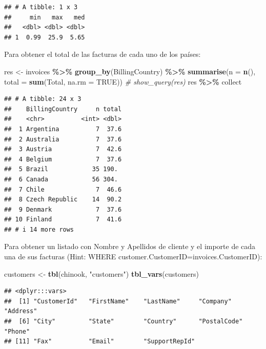 \documentclass[
]{book}
\newenvironment{Shaded}{\begin{snugshade}}{\end{snugshade}}
\newcommand{\AttributeTok}[1]{\textcolor[rgb]{0.13,0.29,0.53}{#1}}
\newcommand{\CommentTok}[1]{\textcolor[rgb]{0.56,0.35,0.01}{\textit{#1}}}
\newcommand{\ConstantTok}[1]{\textcolor[rgb]{0.56,0.35,0.01}{#1}}
\newcommand{\FunctionTok}[1]{\textcolor[rgb]{0.13,0.29,0.53}{\textbf{#1}}}
\newcommand{\NormalTok}[1]{#1}
\newcommand{\OtherTok}[1]{\textcolor[rgb]{0.56,0.35,0.01}{#1}}
\newcommand{\SpecialCharTok}[1]{\textcolor[rgb]{0.81,0.36,0.00}{\textbf{#1}}}
\newcommand{\StringTok}[1]{\textcolor[rgb]{0.31,0.60,0.02}{#1}}
\begin{document}
\begin{verbatim}
## # A tibble: 1 x 3
##     min   max   med
##   <dbl> <dbl> <dbl>
## 1  0.99  25.9  5.65
\end{verbatim}

Para obtener el total de las facturas de cada uno de los países:

\begin{Shaded}
\begin{Highlighting}[]
\NormalTok{res }\OtherTok{\textless{}{-}}\NormalTok{ invoices }\SpecialCharTok{\%\textgreater{}\%} \FunctionTok{group\_by}\NormalTok{(BillingCountry) }\SpecialCharTok{\%\textgreater{}\%} 
          \FunctionTok{summarise}\NormalTok{(}\AttributeTok{n =} \FunctionTok{n}\NormalTok{(), }\AttributeTok{total =} \FunctionTok{sum}\NormalTok{(Total, }\AttributeTok{na.rm =} \ConstantTok{TRUE}\NormalTok{))}
\CommentTok{\# show\_query(res)}
\NormalTok{res  }\SpecialCharTok{\%\textgreater{}\%}\NormalTok{ collect}
\end{Highlighting}
\end{Shaded}

\begin{verbatim}
## # A tibble: 24 x 3
##    BillingCountry     n total
##    <chr>          <int> <dbl>
##  1 Argentina          7  37.6
##  2 Australia          7  37.6
##  3 Austria            7  42.6
##  4 Belgium            7  37.6
##  5 Brazil            35 190. 
##  6 Canada            56 304. 
##  7 Chile              7  46.6
##  8 Czech Republic    14  90.2
##  9 Denmark            7  37.6
## 10 Finland            7  41.6
## # i 14 more rows
\end{verbatim}

Para obtener un listado con Nombre y Apellidos de cliente y el importe de cada una de sus facturas (Hint: WHERE customer.CustomerID=invoices.CustomerID):

\begin{Shaded}
\begin{Highlighting}[]
\NormalTok{customers }\OtherTok{\textless{}{-}} \FunctionTok{tbl}\NormalTok{(chinook, }\StringTok{"customers"}\NormalTok{)}
\FunctionTok{tbl\_vars}\NormalTok{(customers) }
\end{Highlighting}
\end{Shaded}

\begin{verbatim}
## <dplyr:::vars>
##  [1] "CustomerId"   "FirstName"    "LastName"     "Company"      "Address"     
##  [6] "City"         "State"        "Country"      "PostalCode"   "Phone"       
## [11] "Fax"          "Email"        "SupportRepId"
\end{verbatim}
\end{document}
